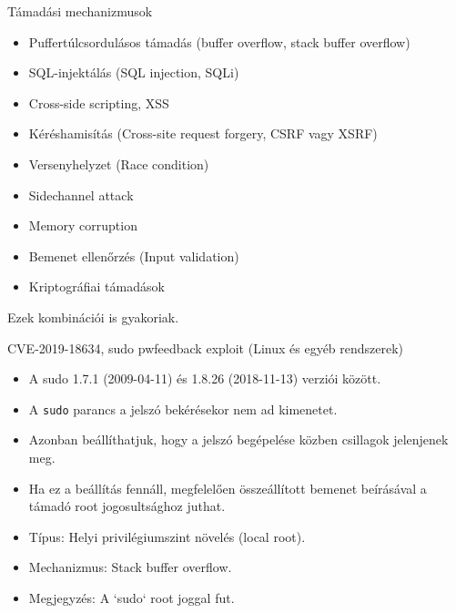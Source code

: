 \documentclass[12 pt]{beamer}
\begin{document}
\begin{frame}{Támadási mechanizmusok}
  \begin{itemize}
    \item{Puffertúlcsordulásos támadás (buffer overflow, stack buffer overflow)}
    \item{SQL-injektálás (SQL injection, SQLi)}
    \item{Cross-side scripting, XSS}
    \item{Kéréshamisítás (Cross-site request forgery, CSRF vagy XSRF)}
    \item{Versenyhelyzet (Race condition)}
    \item{Sidechannel attack}
    \item{Memory corruption}
    \item{Bemenet ellenőrzés (Input validation)}
    \item{Kriptográfiai támadások}
  \end{itemize}

  \qquad

  Ezek kombinációi is gyakoriak.
\end{frame}

\begin{frame}{CVE-2019-18634, sudo pwfeedback exploit (Linux és egyéb rendszerek)}
  \begin{itemize}
    \item{A sudo 1.7.1 (2009-04-11) és 1.8.26 (2018-11-13) verziói között.}
    \item{A \texttt{sudo} parancs a jelszó bekérésekor nem ad kimenetet.}
    \item{Azonban beállíthatjuk, hogy a jelszó begépelése közben csillagok jelenjenek meg.}
    \item{Ha ez a beállítás fennáll, megfelelően összeállított bemenet beírásával a támadó root jogosultsághoz juthat.}
    \item{Típus: Helyi privilégiumszint növelés (local root).}
    \item{Mechanizmus: Stack buffer overflow.}
    \item{Megjegyzés: A `sudo` root joggal fut.}
  \end{itemize}
\end{frame}

\end{document}
